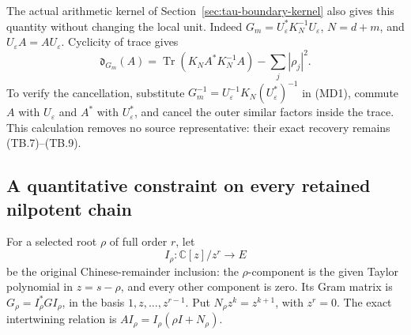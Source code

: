 The actual arithmetic kernel of Section~\ref{sec:tau-boundary-kernel}
also gives this quantity without changing the local unit. Indeed
\(G_m=U_\varepsilon^*K_N^{-1}U_\varepsilon\), \(N=d+m\), and
\(U_\varepsilon A=AU_\varepsilon\). Cyclicity of trace gives
\[
 \mathfrak d_{G_m}(A)
   =\operatorname{Tr}(K_NA^*K_N^{-1}A)-\sum_j|\rho_j|^2.
 \tag{MD6}
\]
To verify the cancellation, substitute
\(G_m^{-1}=U_\varepsilon^{-1}K_N(U_\varepsilon^*)^{-1}\)
in (MD1), commute \(A\) with \(U_\varepsilon\) and \(A^*\)
with \(U_\varepsilon^*\), and cancel the outer similar factors
inside the trace. This calculation removes no source representative:
their exact recovery remains (TB.7)--(TB.9).

\subsection{A quantitative constraint on every retained nilpotent chain}
For a selected root \(\rho\) of full order \(r\), let
\[
 I_\rho:\mathbb C[z]/z^r\longrightarrow E
\]
be the original Chinese-remainder inclusion: the \(\rho\)-component
is the given Taylor polynomial in \(z=s-\rho\), and every other
component is zero. Its Gram matrix is
\(G_\rho=I_\rho^*GI_\rho\), in the basis
\(1,z,\ldots,z^{r-1}\). Put \(N_\rho z^k=z^{k+1}\), with
\(z^r=0\). The exact intertwining relation is
\(AI_\rho=I_\rho(\rho I+N_\rho)\).

